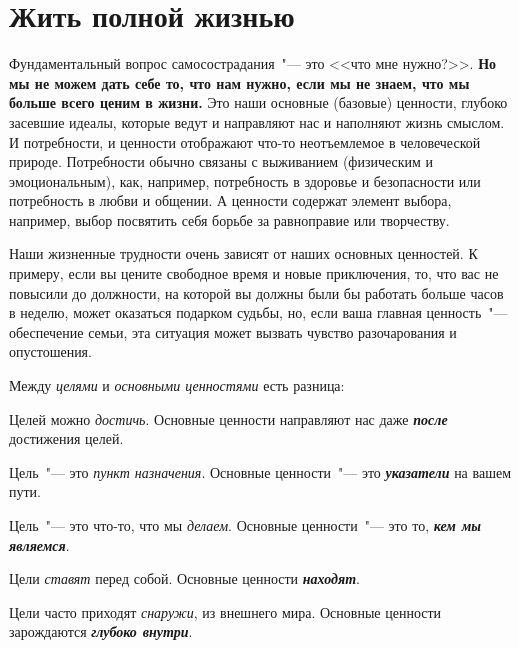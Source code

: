 
\chapter{Жить полной жизнью} \label{Living_Deeply}

Фундаментальный вопрос самосострадания~"--- это <<что мне нужно?>>. \textbf{Но мы не можем дать себе то, что нам нужно, если мы не знаем, что мы больше всего ценим в жизни.} Это наши основные (базовые) ценности, глубоко засевшие идеалы, которые ведут и направляют нас и наполняют жизнь смыслом. И потребности, и ценности отображают что-то неотъемлемое в человеческой природе. Потребности обычно связаны с выживанием (физическим и эмоциональным), как, например, потребность в здоровье и безопасности или потребность в любви и общении. А ценности содержат элемент выбора, например, выбор посвятить себя борьбе за равноправие или творчеству. 

Наши жизненные трудности очень зависят от наших основных ценностей. К примеру, если вы цените свободное время и новые приключения, то, что вас не повысили до должности, на которой вы должны были бы работать больше часов в неделю, может оказаться подарком судьбы, но, если ваша главная ценность~"--- обеспечение семьи, эта ситуация может вызвать чувство разочарования и опустошения.

\vspace{2ex}

Между \emph{целями} и \emph{основными ценностями} есть разница:

\begin{itemize}
	\itemdiamondsuit Целей можно \emph{достичь}. Основные ценности направляют нас даже \emph{\textbf{после}} достижения целей.

	\itemdiamondsuit Цель~"--- это \emph{пункт назначения}. Основные ценности~"--- это \emph{\textbf{указатели}} на вашем пути.

	\itemdiamondsuit Цель~"--- это что-то, что мы \emph{делаем}. Основные ценности~"--- это то, \emph{\textbf{кем мы являемся}}.

	\itemdiamondsuit Цели \emph{ставят} перед собой. Основные ценности \emph{\textbf{находят}}.

	\itemdiamondsuit Цели часто приходят \emph{снаружи}, из внешнего мира. Основные ценности зарождаются \emph{\textbf{глубоко внутри}}. 
\end{itemize}

\vspace{2ex}

